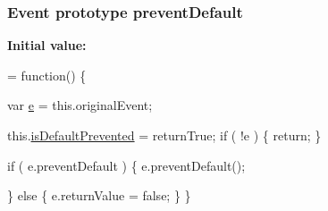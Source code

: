 \subsubsection[{prevent\+Default}]{ {\bf Event} {\bf prototype} prevent\+Default}\label{jquery-1_810_82-vsdoc_8js_aafc4d39414b638f56c88573e5f8b4fb4}
{\bfseries Initial value\+:}
\begin{DoxyCode}
= \textcolor{keyword}{function}() \{


        var \hyperlink{_bibabook_2_scripts_2jquery-1_810_82_8min_8js_a2c038346d47955cbe2cb91e338edd7e1}{e} = this.originalEvent;

        this.\hyperlink{jquery-1_810_82-vsdoc_8js_af36c584d7af0deb379b8d6e3116775cc}{isDefaultPrevented} = returnTrue;
        \textcolor{keywordflow}{if} ( !e ) \{
            \textcolor{keywordflow}{return};
        \}

        
        \textcolor{keywordflow}{if} ( e.preventDefault ) \{
            e.preventDefault();

        
        
        \} \textcolor{keywordflow}{else} \{
            e.returnValue = \textcolor{keyword}{false};
        \}
    \}
\end{DoxyCode}
\hypertarget{jquery-1_810_82-vsdoc_8js_a261c6b8aae4b0d984ef1bb06c1caa7d1}{}
